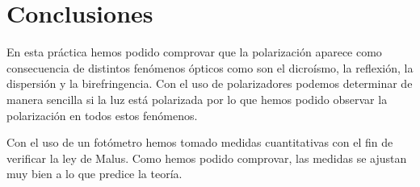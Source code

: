 \documentclass[12pt]{article}
\numberwithin{table}{section}
\numberwithin{figure}{section}
\numberwithin{equation}{section}
\begin{document}
\section{Conclusiones}
En esta práctica hemos podido comprovar que la polarización aparece como consecuencia de distintos fenómenos ópticos como son el dicroísmo, la reflexión, la dispersión y la birefringencia. Con el uso de polarizadores podemos determinar de manera sencilla si la luz está polarizada por lo que hemos podido observar la polarización en todos estos fenómenos.

Con el uso de un fotómetro hemos tomado medidas cuantitativas con el fin de verificar la ley de Malus. Como hemos podido comprovar, las medidas se ajustan muy bien a lo que predice la teoría.

\newpage \null\newpage
\end{document}
